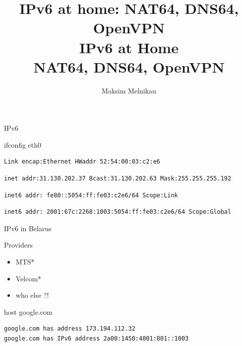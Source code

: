 \documentclass[aspectratio=169]{beamer}
\begin{document}
\title{IPv6 at home: NAT64, DNS64, OpenVPN}
\author{Maksim Melnikau}
\date{}

{
\title{
    \\
    {\Huge IPv6 at Home\\ \vspace{1em} NAT64, DNS64, OpenVPN}
    \\
}

\begin{frame}[plain]{}
    \titlepage
\end{frame}
}

\begin{frame}[fragile]{IPv6}
\begin{block}{ifconfig eth0}
\begin{verbatim}Link encap:Ethernet HWaddr 52:54:00:03:c2:e6\end{verbatim} 
\begin{verbatim}inet addr:31.130.202.37 Bcast:31.130.202.63 Mask:255.255.255.192\end{verbatim}
\pause
\begin{verbatim}inet6 addr: fe80::5054:ff:fe03:c2e6/64 Scope:Link\end{verbatim}
\pause
\begin{verbatim}inet6 addr: 2001:67c:2268:1003:5054:ff:fe03:c2e6/64 Scope:Global\end{verbatim}
\end{block}
\end{frame}

\begin{frame}[fragile]{IPv6 in Belarus}
\begin{block}{Providers}
\begin{itemize}
\item MTS*
\item Velcom*
\item who else ?!
\end{itemize}
\end{block}

\begin{block}{host google.com}
\begin{verbatim}google.com has address 173.194.112.32
google.com has IPv6 address 2a00:1450:4001:801::1003\end{verbatim}
\end{block}
\end{frame}
\end{document}
